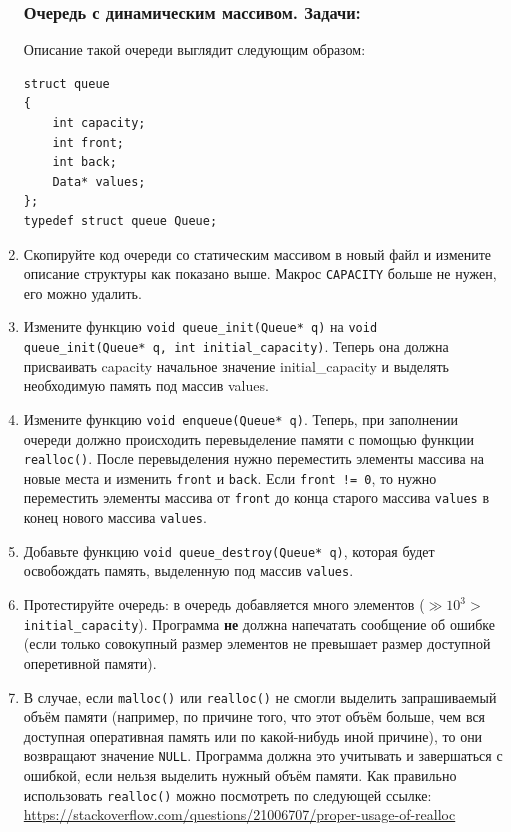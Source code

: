 \documentclass{article}
\begin{document}
\begin{enumerate}
\subsubsection*{Очередь с динамическим массивом. Задачи:}

Описание такой очереди выглядит следующим образом:
\begin{lstlisting}
struct queue
{
    int capacity;
    int front;
    int back;
    Data* values;
};
typedef struct queue Queue;
\end{lstlisting}

\item Скопируйте код очереди со статическим массивом в новый файл и измените описание структуры как показано выше. Макрос \texttt{CAPACITY} больше не нужен, его можно удалить.

\item Измените функцию \texttt{void queue\_init(Queue* q)} на \texttt{void queue\_init(Queue* q, int initial\_capacity)}. Теперь она должна присваивать capacity начальное значение initial\_capacity и выделять необходимую память под массив values.

\item Измените функцию \texttt{void enqueue(Queue* q)}. Теперь, при заполнении очереди должно происходить перевыделение памяти с помощью функции \texttt{realloc()}. После перевыделения нужно переместить элементы массива на новые места и изменить \texttt{front} и \texttt{back}. Если \texttt{front != 0}, то нужно переместить элементы массива от \texttt{front} до конца старого массива \texttt{values} в конец нового массива \texttt{values}.

\item Добавьте функцию \texttt{void queue\_destroy(Queue* q)}, которая будет освобождать память, выделенную под массив \texttt{values}.

\item Протестируйте очередь: в очередь добавляется много элементов ($\gg 10^3 >$ \texttt{initial\_capacity}). Программа \textbf{не} должна напечатать сообщение об ошибке (если только совокупный размер элементов не превышает размер доступной оперетивной памяти). 

\item В случае, если \texttt{malloc()} или \texttt{realloc()} не смогли выделить запрашиваемый объём памяти (например, по причине того, что этот объём  больше, чем вся доступная оперативная память или по какой-нибудь иной причине), то они возвращают значение \texttt{NULL}. Программа должна это учитывать и завершаться с ошибкой, если нельзя выделить нужный объём памяти.
Как правильно использовать \texttt{realloc()} можно посмотреть по следующей ссылке:\\
\href{https://stackoverflow.com/questions/21006707/proper-usage-of-realloc}{https://stackoverflow.com/questions/21006707/proper-usage-of-realloc}
\end{enumerate}
\end{document}
